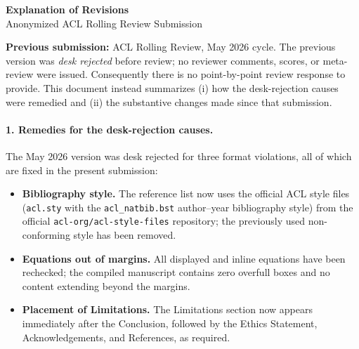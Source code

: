 \documentclass[11pt]{article}
\begin{document}
\begin{center}
{\Large \textbf{Explanation of Revisions}}\\[8pt]
{\large Anonymized ACL Rolling Review Submission}\\[4pt]
\end{center}

\noindent\textbf{Previous submission:} ACL Rolling Review, May 2026 cycle. The previous version was \emph{desk rejected} before review; no reviewer comments, scores, or meta-review were issued. Consequently there is no point-by-point review response to provide. This document instead summarizes (i) how the desk-rejection causes were remedied and (ii) the substantive changes made since that submission.

\paragraph{1. Remedies for the desk-rejection causes.}
The May 2026 version was desk rejected for three format violations, all of which are fixed in the present submission:
\begin{itemize}
\item \textbf{Bibliography style.} The reference list now uses the official ACL style files (\texttt{acl.sty} with the \texttt{acl\_natbib.bst} author--year bibliography style) from the official \texttt{acl-org/acl-style-files} repository; the previously used non-conforming style has been removed.
\item \textbf{Equations out of margins.} All displayed and inline equations have been rechecked; the compiled manuscript contains zero overfull boxes and no content extending beyond the margins.
\item \textbf{Placement of Limitations.} The Limitations section now appears immediately after the Conclusion, followed by the Ethics Statement, Acknowledgements, and References, as required.
\end{itemize}
\end{document}
